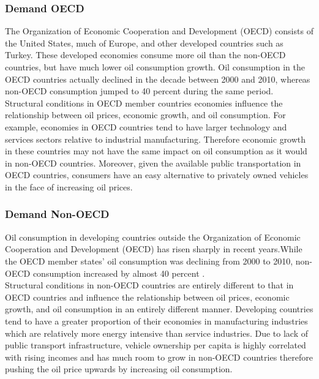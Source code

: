 \subsubsection{Demand OECD}

The Organization of Economic Cooperation and Development (OECD) consists of the United States, much of Europe, and other developed countries such as Turkey. These developed economies consume more oil than the non-OECD countries, but have much lower oil consumption growth. Oil consumption in the OECD countries actually declined in the decade between 2000 and 2010, whereas non-OECD consumption jumped to 40 percent during the same period. \\

Structural conditions in OECD member countries economies influence\cite{oecd} the relationship between oil prices, economic growth, and oil consumption. For example, economies in OECD countries tend to have larger technology and services sectors relative to industrial manufacturing. Therefore economic growth in these countries may not have the same impact on oil consumption as it would in non-OECD countries.  Moreover, given the available public transportation in OECD countries, consumers have an easy alternative to privately owned vehicles in the face of increasing oil prices. \\


\subsubsection{Demand Non-OECD}

Oil consumption in developing countries outside the Organization of Economic Cooperation and Development (OECD) has risen sharply in recent years.While the OECD member states' oil consumption was declining from 2000 to 2010, non-OECD consumption increased by almost 40 percent \cite{nonoecd}. \\

Structural conditions in non-OECD countries are entirely different to that in OECD countries and influence the relationship between oil prices, economic growth, and  oil consumption in an entirely different manner. Developing countries tend to have a greater proportion of their economies in manufacturing industries which are relatively more energy intensive than service industries. Due to lack of public transport infrastructure, vehicle ownership per capita is highly correlated with rising incomes and has much room to grow in non-OECD countries therefore pushing the oil price upwards by increasing oil consumption. \\


